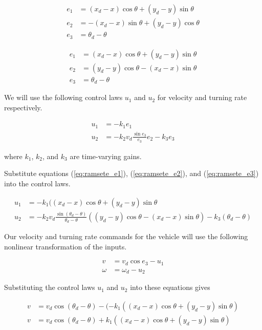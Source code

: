 \begin{align*}
  e_1 &= (x_d - x) \cos\theta + (y_d - y) \sin\theta \\
  e_2 &= -(x_d - x) \sin\theta + (y_d - y) \cos\theta \\
  e_3 &= \theta_d - \theta
\end{align*}

\begin{align}
  e_1 &= (x_d - x) \cos\theta + (y_d - y) \sin\theta \label{eq:ramsete_e1} \\
  e_2 &= (y_d - y) \cos\theta - (x_d - x) \sin\theta \label{eq:ramsete_e2} \\
  e_3 &= \theta_d - \theta \label{eq:ramsete_e3}
\end{align}

We will use the following control laws $u_1$ and $u_2$ for velocity and turning
rate respectively.

\begin{equation}
  \begin{aligned}
    u_1 &= -k_1 e_1 \\
    u_2 &= -k_2 v_d \frac{\sin{e_3}}{e_3} e_2 - k_3 e_3
  \end{aligned}
  \label{eq:ramsete_u}
\end{equation}

where $k_1$, $k_2$, and $k_3$ are time-varying gains.

Substitute equations (\ref{eq:ramsete_e1}), (\ref{eq:ramsete_e2}), and
(\ref{eq:ramsete_e3}) into the control laws.

\begin{align*}
  u_1 &= -k_1 ((x_d - x) \cos\theta + (y_d - y) \sin\theta \\
  u_2 &= -k_2 v_d \frac{\sin(\theta_d - \theta)}{\theta_d - \theta}
    ((y_d - y) \cos\theta - (x_d - x) \sin\theta) - k_3 (\theta_d - \theta)
\end{align*}

Our velocity and turning rate commands for the vehicle will use the following
nonlinear transformation of the inputs.

\begin{align*}
  v &= v_d\cos e_3 - u_1 \\
  \omega &= \omega_d - u_2
\end{align*}

Substituting the control laws $u_1$ and $u_2$ into these equations gives

\begin{align*}
  v &= v_d\cos(\theta_d - \theta) -
    (-k_1 ((x_d - x) \cos\theta + (y_d - y) \sin\theta) \\
  v &= v_d\cos(\theta_d - \theta) +
    k_1 ((x_d - x) \cos\theta + (y_d - y) \sin\theta) \\
\end{align*}

